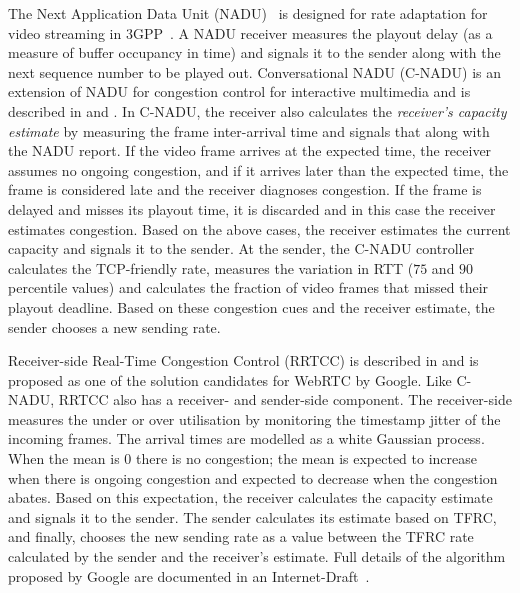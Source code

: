 The Next Application Data Unit (NADU)~\cite{nadu.1070341,nadu.1530486} is designed
for rate adaptation for video streaming in 3GPP~\cite{3gpp.26.234}. A NADU
receiver measures the playout delay (as a measure of buffer occupancy in time)
and signals it to the sender along with the next sequence number to be played
out. Conversational NADU (C-NADU) is an extension of NADU for congestion
control for interactive multimedia and is described in  and
. In C-NADU, the receiver also calculates the
\emph{receiver's capacity estimate} by measuring the frame inter-arrival time
and signals that along with the NADU report. If the video frame arrives at the
expected time, the receiver assumes no ongoing congestion, and if it arrives
later than the expected time, the frame is considered late and the receiver
diagnoses congestion. If the frame is delayed and misses its playout time, it
is discarded and in this case the receiver estimates congestion. Based on the
above cases, the receiver estimates the current capacity and signals it to the
sender. At the sender, the C-NADU controller calculates the TCP-friendly rate,
measures the variation in RTT ($75$ and $90$ percentile values) and calculates
the fraction of video frames that missed their playout deadline. Based on
these congestion cues and the receiver estimate, the sender chooses a new
sending rate.


Receiver-side Real-Time Congestion Control (RRTCC) is described in
\cite{draft.rrtcc} and is proposed as one of the solution candidates for
WebRTC by Google. Like C-NADU, RRTCC also has a receiver- and sender-side
component. The receiver-side measures the under or over utilisation by
monitoring the timestamp jitter of the incoming frames. The arrival times are
modelled as a white Gaussian process. When the mean is 0 there is no
congestion; the mean is expected to increase when there is ongoing congestion
and expected to decrease when the congestion abates. Based on this
expectation, the receiver calculates the capacity estimate and signals it to
the sender. The sender calculates its estimate based on TFRC, and finally,
chooses the new sending rate as a value between the TFRC rate calculated by
the sender and the receiver's estimate. Full details of the algorithm proposed by
Google are documented in an Internet-Draft~\cite{draft.rrtcc}.



